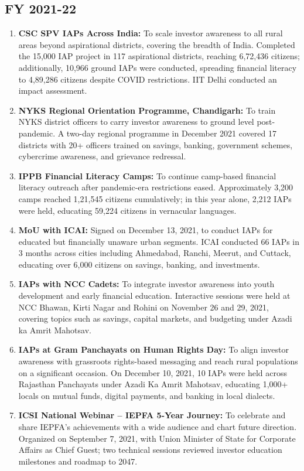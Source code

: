 \documentclass[openany]{book}
\begin{document}
\subsection{FY 2021-22}
\begin{enumerate}
    \item \textbf{CSC SPV IAPs Across India:} To scale investor awareness to all rural areas beyond aspirational districts, covering the breadth of India. Completed the 15,000 IAP project in 117 aspirational districts, reaching 6,72,436 citizens; additionally, 10,966 ground IAPs were conducted, spreading financial literacy to 4,89,286 citizens despite COVID restrictions. IIT Delhi conducted an impact assessment.
    \item \textbf{NYKS Regional Orientation Programme, Chandigarh:} To train NYKS district officers to carry investor awareness to ground level post-pandemic. A two-day regional programme in December 2021 covered 17 districts with 20+ officers trained on savings, banking, government schemes, cybercrime awareness, and grievance redressal.
    \item \textbf{IPPB Financial Literacy Camps:} To continue camp-based financial literacy outreach after pandemic-era restrictions eased. Approximately 3,200 camps reached 1,21,545 citizens cumulatively; in this year alone, 2,212 IAPs were held, educating 59,224 citizens in vernacular languages.
    \item \textbf{MoU with ICAI:} Signed on December 13, 2021, to conduct IAPs for educated but financially unaware urban segments. ICAI conducted 66 IAPs in 3 months across cities including Ahmedabad, Ranchi, Meerut, and Cuttack, educating over 6,000 citizens on savings, banking, and investments.
    \item \textbf{IAPs with NCC Cadets:} To integrate investor awareness into youth development and early financial education. Interactive sessions were held at NCC Bhawan, Kirti Nagar and Rohini on November 26 and 29, 2021, covering topics such as savings, capital markets, and budgeting under Azadi ka Amrit Mahotsav.
    \item \textbf{IAPs at Gram Panchayats on Human Rights Day:} To align investor awareness with grassroots rights-based messaging and reach rural populations on a significant occasion. On December 10, 2021, 10 IAPs were held across Rajasthan Panchayats under Azadi Ka Amrit Mahotsav, educating 1,000+ locals on mutual funds, digital payments, and banking in local dialects.
    \item \textbf{ICSI National Webinar – IEPFA 5-Year Journey:} To celebrate and share IEPFA's achievements with a wide audience and chart future direction. Organized on September 7, 2021, with Union Minister of State for Corporate Affairs as Chief Guest; two technical sessions reviewed investor education milestones and roadmap to 2047.

\end{enumerate}
\end{document}
